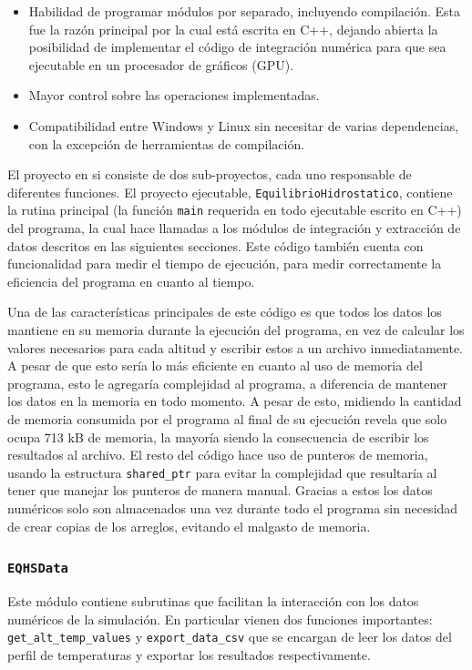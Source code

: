 \begin{itemize}
	\item Habilidad de programar módulos por separado, incluyendo compilación.
	Esta fue la razón principal por la cual está escrita en C++, dejando abierta
	la posibilidad de implementar el código de integración numérica para que sea
	ejecutable en un procesador de gráficos (GPU). 
	\item Mayor control sobre las operaciones implementadas.
 	\item Compatibilidad entre Windows y Linux sin necesitar de varias
 	dependencias, con la excepción de herramientas de compilación.
\end{itemize}

El proyecto en si consiste de dos sub-proyectos, cada uno responsable de
diferentes funciones. El proyecto ejecutable, \verb|EquilibrioHidrostatico|,
contiene la rutina principal (la función \verb|main| requerida en todo
ejecutable escrito en C++) del programa, la cual hace llamadas a los módulos de
integración y extracción de datos descritos en las siguientes secciones. Este
código también cuenta con funcionalidad para medir el tiempo de ejecución, para
medir correctamente la eficiencia del programa en cuanto al tiempo.

Una de las características principales de este código es que todos los datos los
mantiene en su memoria durante la ejecución del programa, en vez de calcular los
valores necesarios para cada altitud y escribir estos a un archivo
inmediatamente. A pesar de que esto sería lo más eficiente en cuanto al uso de
memoria del programa, esto le agregaría complejidad al programa, a diferencia de
mantener los datos en la memoria en todo momento. A pesar de esto, midiendo la
cantidad de memoria consumida por el programa al final de su ejecución revela
que solo ocupa 713 kB de memoria, la mayoría siendo la consecuencia de escribir
los resultados al archivo. El resto del código hace uso de punteros de memoria,
usando la estructura \verb|shared_ptr| para evitar la complejidad que resultaría
al tener que manejar los punteros de manera manual. Gracias a estos los datos
numéricos solo son almacenados una vez durante todo el programa sin necesidad de
crear copias de los arreglos, evitando el malgasto de memoria.

\subsubsection{\texttt{EQHS\textunderscore Data}} \label{sec:eqhsData} Este
módulo contiene subrutinas que facilitan la interacción con los datos numéricos
de la simulación. En particular vienen dos funciones importantes:
\verb|get_alt_temp_values| y \verb|export_data_csv| que se encargan de leer los
datos del perfil de temperaturas y exportar los resultados respectivamente. 

